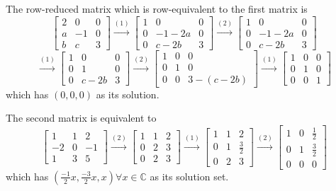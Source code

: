 \documentclass{article}
\begin{document}
\begin{enumerate}[listparindent=\parindent]
The row-reduced matrix which is row-equivalent to the first matrix is
\[
    \begin{bmatrix}
        2 & 0 & 0 \\
        a & -1 & 0 \\
        b & c & 3
    \end{bmatrix}
    \xrightarrow{(1)}
    \begin{bmatrix}
        1 & 0 & 0 \\
        0 & -1 - 2a & 0 \\
        0 & c - 2b & 3
    \end{bmatrix}
    \xrightarrow{(2)}
    \begin{bmatrix}
        1 & 0 & 0 \\
        0 & -1 - 2a & 0 \\
        0 & c - 2b & 3
    \end{bmatrix}
\]
\[
    \xrightarrow{(1)}
    \begin{bmatrix}
        1 & 0 & 0 \\
        0 & 1 & 0 \\
        0 & c - 2b & 3
    \end{bmatrix}
    \xrightarrow{(2)}
    \begin{bmatrix}
        1 & 0 & 0 \\
        0 & 1 & 0 \\
        0 & 0 & 3 - (c - 2b)
    \end{bmatrix}
    \xrightarrow{(1)}
    \boxed{
        \begin{bmatrix}
            1 & 0 & 0 \\
            0 & 1 & 0 \\
            0 & 0 & 1
        \end{bmatrix}
    }
\]
which has \( (0, 0, 0) \) as its solution.

The second matrix is equivalent to
\[
    \begin{bmatrix}
        1 & 1 & 2 \\
        -2 & 0 & -1 \\
        1 & 3 & 5
    \end{bmatrix}
    \xrightarrow{(2)}
    \begin{bmatrix}
        1 & 1 & 2 \\
        0 & 2 & 3 \\
        0 & 2 & 3
    \end{bmatrix}
    \xrightarrow{(1)}
    \begin{bmatrix}
        1 & 1 & 2 \\
        0 & 1 & \frac{3}{2} \\
        0 & 2 & 3
    \end{bmatrix}
    \xrightarrow{(2)}
    \boxed{
        \begin{bmatrix}
            1 & 0 & \frac{1}{2} \\
            0 & 1 & \frac{3}{2} \\
            0 & 0 & 0
        \end{bmatrix}
    }
\]
which has \( (\frac{-1}{2}x, \frac{-3}{2}x, x) \forall x \in \mathbb C \) as its solution set.


\end{enumerate}
\end{document}
